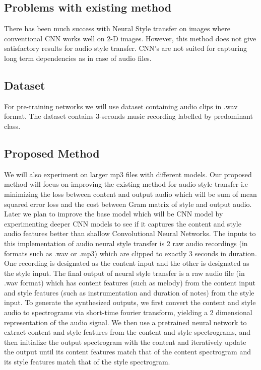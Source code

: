 \documentclass[10pt,twocolumn,letterpaper]{article}
\begin{document}
\subsection{Problems with existing method}
There has been much success with Neural Style transfer
on images where conventional CNN works well on 2-D
images. However, this method does not give satisfactory
results for audio style transfer. CNN’s are not suited for
capturing long term dependencies as in case of audio files.

\subsection{Dataset}
For pre-training networks we will use dataset containing audio clips in .wav format. The dataset  contains 3-seconds music recording labelled by predominant class.

\subsection{Proposed Method}
We will also experiment on larger mp3 files with different models. Our proposed method will focus on improving the existing method for audio
style transfer i.e minimizing the loss between content
and output audio which will be sum of mean squared error
loss and the cost between Gram matrix of style and output
audio. Later we plan to improve the base model which will be CNN model by experimenting deeper CNN models to see if it captures the content and style audio features better than shallow Convolutional Neural Networks.
The inputs to this implementation of audio neural style transfer is 2 raw audio recordings (in formats such as .wav or .mp3) which are clipped to exactly 3 seconds in duration. One recording is designated as the content input and the other is designated as the style input. The final output of neural style transfer is a raw audio file (in .wav format) which has content features (such as melody)
from the content input and style features (such as instrumentation and duration of notes) from the
style input. 
To generate the synthesized outputs, we first convert the content and style audio to spectrograms via short-time fourier transform, yielding a 2 dimensional representation of the audio signal. We then use a pretrained neural network to extract content and style features from the content and style spectrograms, and then initialize the output spectrogram with the content and iteratively update the output until its content features match that of the content spectrogram and its style features match that of the style spectrogram.
\end{document}
